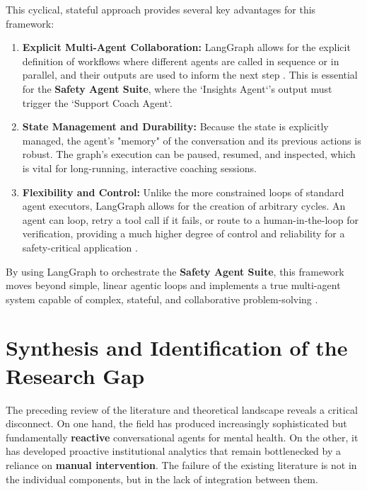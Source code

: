 This cyclical, stateful approach provides several key advantages for this framework:
\begin{enumerate}
    \item \textbf{Explicit Multi-Agent Collaboration:} LangGraph allows for the explicit definition of workflows where different agents are called in sequence or in parallel, and their outputs are used to inform the next step \cite{tran2025multiagentcollaboration, mathew2025largelanguagemodelagents}. This is essential for the \textbf{Safety Agent Suite}, where the `Insights Agent`'s output must trigger the `Support Coach Agent`.
    \item \textbf{State Management and Durability:} Because the state is explicitly managed, the agent's "memory" of the conversation and its previous actions is robust. The graph's execution can be paused, resumed, and inspected, which is vital for long-running, interactive coaching sessions.
    \item \textbf{Flexibility and Control:} Unlike the more constrained loops of standard agent executors, LangGraph allows for the creation of arbitrary cycles. An agent can loop, retry a tool call if it fails, or route to a human-in-the-loop for verification, providing a much higher degree of control and reliability for a safety-critical application \cite{tang2025autoagent, aquinodeazevedo2025ragtomultiagent}.
\end{enumerate}

By using LangGraph to orchestrate the \textbf{Safety Agent Suite}, this framework moves beyond simple, linear agentic loops and implements a true multi-agent system capable of complex, stateful, and collaborative problem-solving \cite{yang2025aiagentprotocols, tran2025multiagentcollaboration}.


\section{Synthesis and Identification of the Research Gap}

The preceding review of the literature and theoretical landscape reveals a critical disconnect. On one hand, the field has produced increasingly sophisticated but fundamentally \textbf{reactive} conversational agents for mental health. On the other, it has developed proactive institutional analytics that remain bottlenecked by a reliance on \textbf{manual intervention}. The failure of the existing literature is not in the individual components, but in the lack of integration between them.

